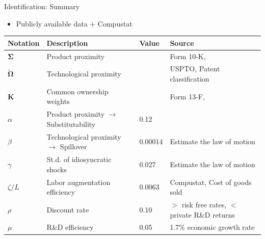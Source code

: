 \documentclass[
  10pt,               %
  aspectratio=169,    %
  handout             %
]{beamer}
\theoremstyle{plain}
\begin{document}
\begin{frame}{Identification: Summary}
  \begin{itemize}
    \item Publicly available data + Compustat
  \end{itemize}
  \begin{table}[h]
    \centering
      \small %
      \begin{tabular}{llll}
        \toprule
        Notation                           & Description                                      & Value   & Source                                   \\
        \midrule
        $\bm{\Sigma}$                   & Product proximity                                &         & Form 10-K, \citet{Hoberg2016-jm}          \\
        $\bm{\widetilde{\Omega}}$       & Technological proximity                          &         & USPTO, Patent classification             \\
        $\bm{K}$                        & Common ownership weights                         &         & Form 13-F, \citet{Backus2021-yt}          \\
        $\alpha$                           & Product proximity $\rightarrow$ Substitutability & 0.12    & \citet{Pellegrino2024-dn}                \\
        $\beta$                            & Technological proximity $\rightarrow$ Spillover  & 0.00014 & Estimate the law of motion               \\
        $\gamma$                           & St.d. of idiosyncratic shocks                    & 0.027   & Estimate the law of motion               \\
        $\zeta/L$                          & Labor augmentation efficiency                    & 0.0063  & Compustat, Cost of goods sold            \\
        $\rho$                             & Discount rate                                    & 0.10    & $>$ risk free rates, $<$ private R\&D returns \\
        $\mu$                              & R\&D efficiency                                  & 0.05    & 1.7\% economic growth rate               \\
        \bottomrule
      \end{tabular}
  \end{table}
\end{frame}
\end{document}
